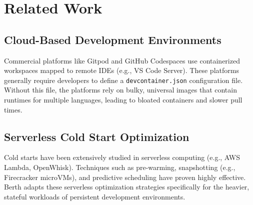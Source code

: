 \section{Related Work}

\subsection{Cloud-Based Development Environments}
Commercial platforms like Gitpod and GitHub Codespaces use containerized workspaces mapped to remote IDEs (e.g., VS Code Server). These platforms generally require developers to define a \texttt{devcontainer.json} configuration file. Without this file, the platforms rely on bulky, universal images that contain runtimes for multiple languages, leading to bloated containers and slower pull times.

\subsection{Serverless Cold Start Optimization}
Cold starts have been extensively studied in serverless computing (e.g., AWS Lambda, OpenWhisk). Techniques such as pre-warming, snapshotting (e.g., Firecracker microVMs), and predictive scheduling have proven highly effective. Berth adapts these serverless optimization strategies specifically for the heavier, stateful workloads of persistent development environments.
